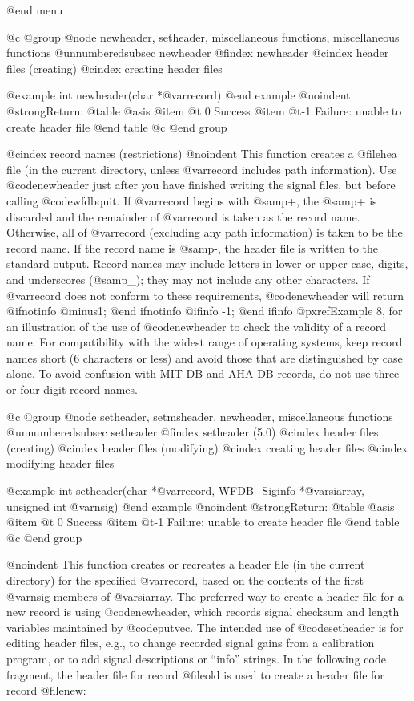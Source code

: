 {{{{{{{{@end menu

@c @group
@node     newheader, setheader, miscellaneous functions, miscellaneous functions
@unnumberedsubsec newheader
@findex newheader
@cindex header files (creating)
@cindex creating header files

@example
int newheader(char *@var{record})
@end example
@noindent
@strong{Return:}
@table @asis
@item @t{ 0}
Success
@item @t{-1}
Failure: unable to create header file
@end table
@c @end group

@cindex record names (restrictions)
@noindent
This function creates a @file{hea} file (in the current directory, unless
@var{record} includes path information).
Use @code{newheader} just after you have finished writing the signal
files, but before calling @code{wfdbquit}.  If @var{record} begins with
@samp{+}, the @samp{+} is discarded and the remainder of @var{record} is
taken as the record name.  Otherwise, all of @var{record} (excluding any
path information) is taken to be
the record name.  If the record name is @samp{-}, the header file
is written to the standard output.  Record names may include letters in
lower or upper case, digits, and underscores (@samp{_}); they may not
include any other characters.  If @var{record} does not conform to these
requirements, @code{newheader} will return
@ifnotinfo
@minus{}1;
@end ifnotinfo
@ifinfo
-1;
@end ifinfo
@pxref{Example 8},
for an illustration of the use of @code{newheader} to check the validity
of a record name.  For compatibility with the widest range of operating
systems, keep record names short (6 characters or less) and avoid those
that are distinguished by case alone.  To avoid confusion with MIT DB
and AHA DB records, do not use three- or four-digit record names.

@c @group
@node     setheader, setmsheader, newheader, miscellaneous functions
@unnumberedsubsec setheader
@findex setheader (5.0)
@cindex header files (creating)
@cindex header files (modifying)
@cindex creating header files
@cindex modifying header files

@example
int setheader(char *@var{record}, WFDB_Siginfo *@var{siarray}, unsigned int @var{nsig})
@end example
@noindent
@strong{Return:}
@table @asis
@item @t{ 0}
Success
@item @t{-1}
Failure: unable to create header file
@end table
@c @end group

@noindent
This function creates or recreates a header file (in the current
directory) for the specified @var{record}, based on the contents of the
first @var{nsig} members of @var{siarray}.  The preferred way to create
a header file for a new record is using @code{newheader}, which records
signal checksum and length variables maintained by @code{putvec}.  The
intended use of @code{setheader} is for editing header files,
e.g., to change recorded signal gains from a calibration program, or to add
signal descriptions or ``info'' strings.  In the following code fragment, the
header file for record @file{old} is used to create a header file for
record @file{new}:

}}}}}}}}
